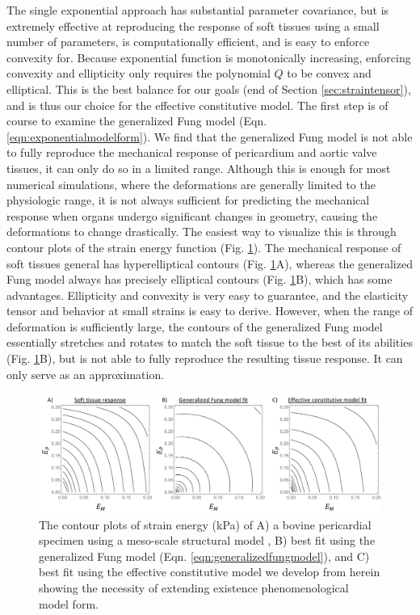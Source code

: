     
    The single exponential approach has substantial parameter covariance, but is extremely effective at reproducing the response of soft tissues using a small number of parameters, is computationally efficient, and is easy to enforce convexity for. Because exponential function is monotonically increasing, enforcing convexity and ellipticity only requires the polynomial $Q$ to be convex and elliptical. This is the best balance for our goals (end of Section \ref{sec:straintensor}), and is thus our choice for the effective constitutive model. The first step is of course to examine the generalized Fung model (Eqn. \ref{eqn:exponentialmodelform}). We find that the generalized Fung model is not able to fully reproduce the mechanical response of pericardium and aortic valve tissues, it can only do so in a limited range. Although this is enough for most numerical simulations, where the deformations are generally limited to the physiologic range, it is not always sufficient for predicting the mechanical response when organs undergo significant changes in geometry, causing the deformations to change drastically. The easiest way to visualize this is through contour plots of the strain energy function (Fig. \ref{fig:strainenergycontours}). The mechanical response of soft tissues general has hyperelliptical contours (Fig. \ref{fig:strainenergycontours}A), whereas the generalized Fung model always has precisely elliptical contours (Fig. \ref{fig:strainenergycontours}B), which has some advantages. Ellipticity and convexity is very easy to guarantee, and the elasticity tensor and behavior at small strains is easy to derive. However, when the range of deformation is sufficiently large, the contours of the generalized Fung model essentially stretches and rotates to match the soft tissue to the best of its abilities (Fig. \ref{fig:strainenergycontours}B), but is not able to fully reproduce the resulting tissue response. It can only serve as an approximation.  


\begin{figure}
\centering
\includegraphics[width=6.5in]{Figures/strainenergycontours}
\caption{The contour plots of strain energy (kPa) of A) a bovine pericardial specimen using a meso-scale structural model \cite{zhang_modeling_2017}, B) best fit using the generalized Fung model (Eqn. \ref{eqn:generalizedfungmodel}), and C) best fit using the effective constitutive model we develop from herein showing the necessity of extending existence phenomenological model form.}
\label{fig:strainenergycontours}
\end{figure}

